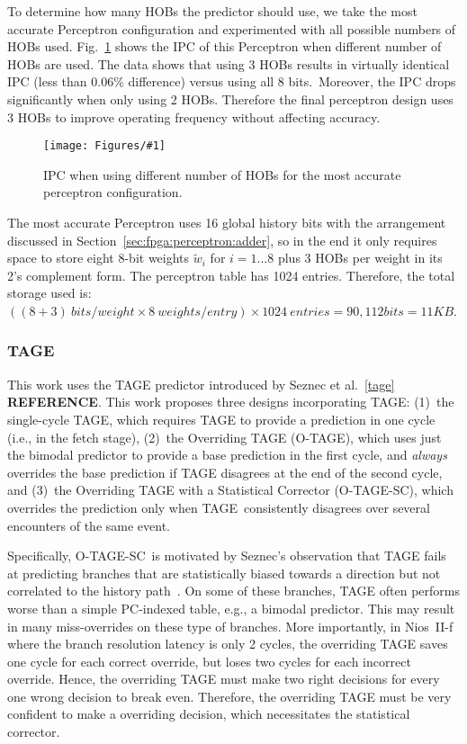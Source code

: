 \documentclass[conference]{IEEEtran}
\newcommand{\kfig}[4]{ %
        \begin{figure}[!t]
        \centering
        \texttt{[image: Figures/\#1]}
        \vspace{-1mm}
        \caption{#3}
        \label{#2}
        \end{figure}
}
\begin{document}
To determine how many HOBs the predictor should use, we take the most accurate Perceptron configuration and experimented with all possible numbers of HOBs used. Fig.~\ref{fig:perceptronHOB} shows the IPC of this Perceptron when different number of HOBs are used. The data shows that using 3 HOBs results in virtually identical IPC (less than 0.06\% difference) versus using all 8 bits.\ Moreover, the IPC drops significantly when only using 2 HOBs. Therefore the final perceptron design uses 3 HOBs to improve operating frequency without affecting accuracy.
\kfig{perceptronHOB.pdf}{fig:perceptronHOB}{IPC when using different number of HOBs for the most accurate perceptron configuration.}{angle = 0, trim = 1in 1.5in 0.9in 1.7in, clip, width=0.4\textwidth}

The most accurate Perceptron uses 16 global history bits with the arrangement discussed in Section~\ref{sec:fpga:perceptron:adder}, so in the end it only requires space to store eight 8-bit weights $\widetilde{w}_{i}$ for $i = 1...8$ plus 3 HOBs per weight in its 2's complement form. The perceptron table has 1024 entries. Therefore, the total storage used is: $ ((8+ 3)\ bits/weight \times 8\ weights/entry)\times 1024\ entries  = 90,112 bits = 11KB$. 

\subsubsection{TAGE}
\label{sec:eval:ipc:tage}
This work uses the TAGE predictor introduced by Seznec et al.~\ref{tage} \textbf{REFERENCE}.  This work proposes three designs incorporating TAGE:  (1)~the single-cycle TAGE, which requires TAGE to provide a prediction in one cycle (i.e., in the fetch stage), (2)~the Overriding TAGE (O-TAGE), which uses just the bimodal predictor to provide a base prediction in the first cycle, and \textit{always} overrides the base prediction if TAGE disagrees at the end of the second cycle, and (3)~the Overriding TAGE with a Statistical Corrector (\mbox{O-TAGE-SC}), which overrides the prediction only when TAGE\ consistently disagrees over several encounters of the same event.

Specifically,  \mbox{O-TAGE-SC}\ is motivated by Seznec's observation that TAGE fails at predicting branches that are statistically biased towards a direction but not correlated to the history path~\cite{isltage}. On some of these branches, TAGE often performs worse than a simple PC-indexed table, e.g., a bimodal predictor. This may result in many miss-overrides on these type of branches. More importantly, in Nios~II-f where the branch resolution latency is only 2 cycles, the overriding TAGE saves one cycle for each correct override, but loses two cycles for each incorrect override. Hence, the overriding TAGE must make two right decisions for every one wrong decision to break even. Therefore, the overriding TAGE must be very confident to make a overriding decision, which necessitates the statistical corrector.
\end{document}
